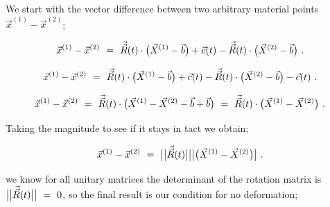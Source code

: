 \documentclass{article}
\begin{document}
We start with the vector difference between two arbitrary material points \begin{math} \vec{x}^{(1)} - \vec{x}^{(2)} \end{math};

\begin{equation} \label{eq:1}
\vec{x}^{(1)} - \vec{x}^{(2)} \hspace{0.125cm} = \hspace{0.125cm} \vec{\vec{R}}(t) \cdot \big( \vec{X}^{(1)} - \vec{b} \big) +  \vec{c}(t) - \vec{\vec{R}}(t) \cdot \big( \vec{X}^{(2)} - \vec{b} \big) \hspace{0.125cm} .
\end{equation}

\begin{equation} \label{eq:1}
\vec{x}^{(1)} - \vec{x}^{(2)} \hspace{0.125cm} = \hspace{0.125cm} \vec{\vec{R}}(t) \cdot \big( \vec{X}^{(1)} - \vec{b} \big) +  \vec{c}(t) - \vec{\vec{R}}(t) \cdot \big( \vec{X}^{(2)} - \vec{b} \big) - \vec{c}(t) \hspace{0.125cm} .
\end{equation}

\begin{equation} \label{eq:1}
\vec{x}^{(1)} - \vec{x}^{(2)} \hspace{0.125cm} = \hspace{0.125cm} \vec{\vec{R}}(t) \cdot \big( \vec{X}^{(1)} - \vec{X}^{(2)} - \vec{b} + \vec{b} \big)  \hspace{0.125cm} = \hspace{0.125cm} \vec{\vec{R}}(t) \cdot \big( \vec{X}^{(1)} - \vec{X}^{(2)} \big) \hspace{0.125cm} .
\end{equation}

Taking the magnitude to see if it stays in tact we obtain;

\begin{equation} \label{eq:1}
\vec{x}^{(1)} - \vec{x}^{(2)} \hspace{0.125cm} = \hspace{0.125cm} \big|\big| \vec{\vec{R}}(t) \big|\big|  \big| \big( \vec{X}^{(1)} - \vec{X}^{(2)} \big) \big| \hspace{0.125cm} .
\end{equation}

we know for all unitary matrices the determinant of the rotation matrix is \begin{math} \big|\big| \vec{\vec{R}}(t) \big|\big| \hspace{0.125cm} = \hspace{0.125cm} 0 \end{math}, so the final result is our condition for no deformation;
\end{document}
